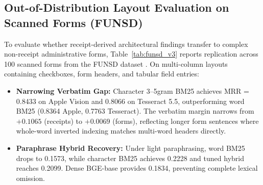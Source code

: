 \documentclass[conference]{IEEEtran}
\begin{document}
\subsection{Out-of-Distribution Layout Evaluation on Scanned Forms (FUNSD)}
To evaluate whether receipt-derived architectural findings transfer to complex non-receipt administrative forms, Table~\ref{tab:funsd_v3} reports replication across 100 scanned forms from the FUNSD dataset \cite{jaume2019funsd}. On multi-column layouts containing checkboxes, form headers, and tabular field entries:
\begin{itemize}
    \setlength{\itemsep}{0.2pt plus 0.1pt}
    \setlength{\parskip}{0pt}
    \item \textbf{Narrowing Verbatim Gap:} Character 3--5gram BM25 achieves MRR = 0.8433 on Apple Vision and 0.8066 on Tesseract 5.5, outperforming word BM25 (0.8364 Apple, 0.7763 Tesseract). The verbatim margin narrows from $+0.1065$ (receipts) to $+0.0069$ (forms), reflecting longer form sentences where whole-word inverted indexing matches multi-word headers directly.
    \item \textbf{Paraphrase Hybrid Recovery:} Under light paraphrasing, word BM25 drops to 0.1573, while character BM25 achieves 0.2228 and tuned hybrid reaches 0.2099. Dense BGE-base provides 0.1834, preventing complete lexical omission.
\end{itemize}
\end{document}

